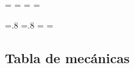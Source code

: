     \newlength{\mtL}
    \setlength{\mtL}{.8\paperheight}%
    \addtolength\mtL{-\headwidth}
    \newpage
    \addtolength\headwidth{\mtL}
    \pdfpageheight=\paperwidth
    \pdfpagewidth=\paperheight
    \paperwidth=\pdfpagewidth
    \paperheight=\pdfpageheight

    \begingroup
    \vsize=.8\pdfpageheight %
    \hsize=.8\pdfpagewidth  %
    \textwidth=\hsize
    \textheight=\vsize

        \subsection{Tabla de mecánicas}
